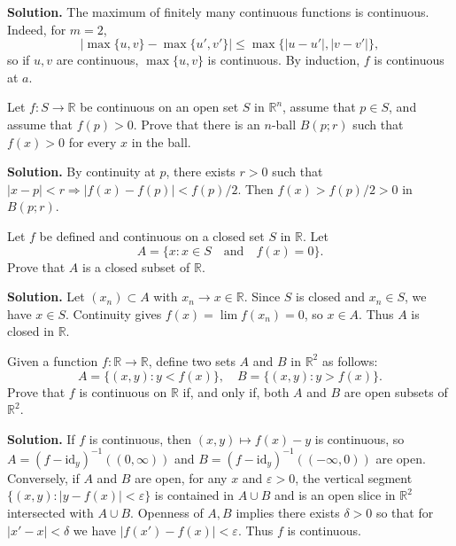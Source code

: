 \noindent\textbf{Solution.}
The maximum of finitely many continuous functions is continuous. Indeed, for $m=2$,
\[
|\max\{u,v\}-\max\{u',v'\}|\le \max\{|u-u'|,|v-v'|\},
\]
so if $u,v$ are continuous, $\max\{u,v\}$ is continuous. By induction, $f$ is continuous at $a$.
\medskip

\begin{problembox}
Let \( f: S \to \mathbb{R} \) be continuous on an open set \( S \) in \( \mathbb{R}^n \), assume that \( p \in S \), and assume that \( f(p) > 0 \). Prove that there is an \( n \)-ball \( B(p; r) \) such that \( f(x) > 0 \) for every \( x \) in the ball.
\end{problembox}

\noindent\textbf{Solution.}
By continuity at $p$, there exists $r>0$ such that $|x-p|<r\Rightarrow |f(x)-f(p)|<f(p)/2$. Then $f(x)>f(p)/2>0$ in $B(p;r)$.
\medskip

\begin{problembox}
Let \( f \) be defined and continuous on a closed set \( S \) in \( \mathbb{R} \). Let
\[A = \{x : x \in S \quad \text{and} \quad f(x) = 0\}.\]
Prove that \( A \) is a closed subset of \( \mathbb{R} \).
\end{problembox}

\noindent\textbf{Solution.}
Let $(x_n)\subset A$ with $x_n\to x\in\mathbb{R}$. Since $S$ is closed and $x_n\in S$, we have $x\in S$. Continuity gives $f(x)=\lim f(x_n)=0$, so $x\in A$. Thus $A$ is closed in $\mathbb{R}$.
\medskip

\begin{problembox}
Given a function \( f: \mathbb{R} \to \mathbb{R} \), define two sets \( A \) and \( B \) in \( \mathbb{R}^2 \) as follows:
\[A = \{(x, y) : y < f(x)\}, \quad B = \{(x, y) : y > f(x)\}.\]
Prove that \( f \) is continuous on \( \mathbb{R} \) if, and only if, both \( A \) and \( B \) are open subsets of \( \mathbb{R}^2 \).
\end{problembox}

\noindent\textbf{Solution.}
If $f$ is continuous, then $(x,y)\mapsto f(x)-y$ is continuous, so $A=(f-\mathrm{id}_y)^{-1}((0,\infty))$ and $B=(f-\mathrm{id}_y)^{-1}(({-}\infty,0))$ are open. Conversely, if $A$ and $B$ are open, for any $x$ and $\varepsilon>0$, the vertical segment $\{(x,y):|y-f(x)|<\varepsilon\}$ is contained in $A\cup B$ and is an open slice in $\mathbb{R}^2$ intersected with $A\cup B$. Openness of $A,B$ implies there exists $\delta>0$ so that for $|x'-x|<\delta$ we have $|f(x')-f(x)|<\varepsilon$. Thus $f$ is continuous.
\medskip


